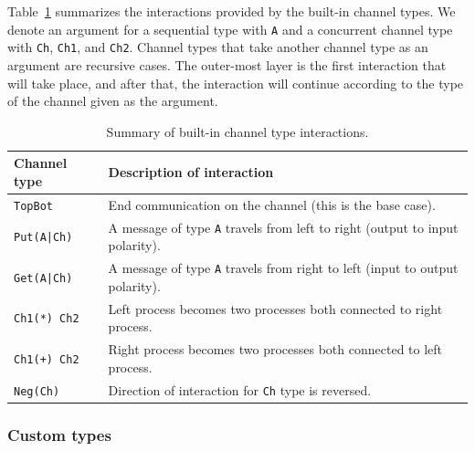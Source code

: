 \documentclass[acmsmall]{acmart}
\begin{document}
Table~\ref{Table:built_in_chs_summary} summarizes the interactions provided by the built-in channel types.
We denote an argument for a sequential type with \lstinline$A$ and a concurrent channel type with \lstinline$Ch$, \lstinline$Ch1$, and \lstinline$Ch2$.
Channel types that take another channel type as an argument are recursive cases. 
The outer-most layer is the first interaction that will take place, and after that, the interaction will continue according to the type of the channel given as the argument.
\begin{table}[!ht]
\begin{center}
	\caption{Summary of built-in channel type interactions.}
	\label{Table:built_in_chs_summary}
\begin{tabular}{| l | l |}
	\hline
	 {\bf Channel type} & {\bf Description of interaction} \\
	 \hline
\lstinline$TopBot$ & End communication on the channel (this is the base case). \\
\lstinline$Put(A|Ch)$ & A message of type \lstinline$A$ travels from left to right (output to input polarity). \\ 
\lstinline$Get(A|Ch)$ & A message of type \lstinline$A$ travels from right to left (input to output polarity). \\
\lstinline$Ch1(*) Ch2$ & Left process becomes two processes both connected to right process. \\
\lstinline$Ch1(+) Ch2$ & Right process becomes two processes both connected to left process. \\
\lstinline$Neg(Ch)$ & Direction of interaction for \lstinline$Ch$ type is reversed. \\ 
		 \hline
\end{tabular}
\end{center}
\end{table}


\subsubsection{Custom types}
\label{Sec:protocols}
\end{document}
